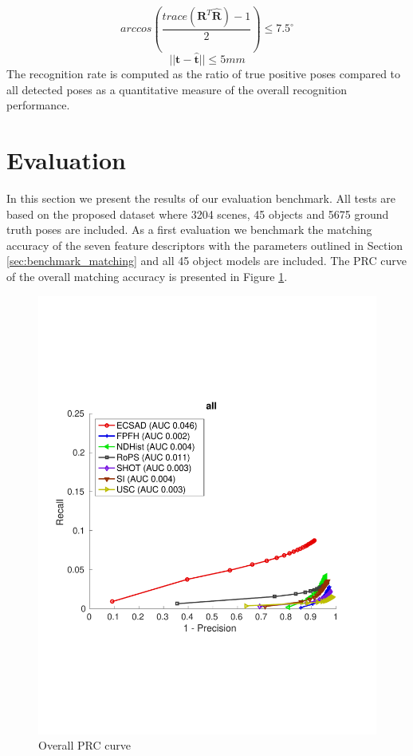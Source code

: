 \documentclass[10pt,twocolumn,letterpaper]{article}
\begin{document}
\begin{equation}\label{eq::rot}
arccos \left(\frac{trace(\textbf{R}^{T}\hat{\textbf{R}})-1}{2}\right) \leq 7.5^\circ
\end{equation}
\begin{equation}\label{eq::trans}
||\textbf{t} - \hat{\textbf{t}} || \leq 5mm
\end{equation}
The recognition rate is computed as the ratio of true positive poses compared to all detected poses as a quantitative measure of the overall recognition performance.
\section{Evaluation}\label{sec:evaluation}
In this section we present the results of our evaluation benchmark. All tests are based on the proposed dataset where 3204 scenes, 45 objects and 5675 ground truth poses are included. As a first evaluation we benchmark the matching accuracy of the seven feature descriptors with the parameters outlined in Section \ref{sec:benchmark_matching} and all 45 object models are included. The PRC curve of the overall matching accuracy is presented in Figure \ref{fig:all_L2_RATIO_zoom}.   
\begin{figure}[h]
\includegraphics[clip, trim=0.7cm 6cm 0.7cm 6cm,width=1.0\linewidth, height= 1.0\linewidth, keepaspectratio]{img/all_L2_RATIO_zoom.pdf} 
\caption{Overall PRC curve}\label{fig:all_L2_RATIO_zoom}
\end{figure}
\end{document}
